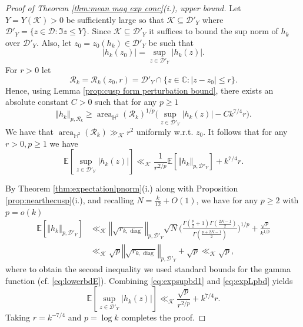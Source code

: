 \documentclass[12pt, a4paper]{amsart}
\newcommand{\tmop}[1]{\ensuremath{\operatorname{#1}}}
\theoremstyle{definition}
\newcommand {\1} {\mathbf{1}}
\newcommand {\Dc} {\mathcal{D}}
\newcommand {\Kc} {\mathcal{K}}
\numberwithin{equation}{section}
\begin{document}
\begin{proof}[Proof of Theorem \ref{thm:mean mag exp conc}(i.), upper bound]
Let $Y=Y(\Kc)>0$ be sufficiently large so that $\Kc \subseteq \Dc'_Y$ where $\Dc'_Y=\{ z \in \Dc : \Im z\le Y\}$. Since $\Kc \subseteq \Dc'_Y$ it suffices to bound the sup norm of $h_k$ over $\Dc'_Y$. Also, let $z_0=z_0(h_k)\in \Dc'_Y$ be such that
\[
|h_k(z_0)|=\sup_{z\in  \Dc'_Y} |h_k(z)|.
\]
For $r>0$ let
\[
\mathcal R_k=\mathcal R_k(z_0,r)=\Dc'_Y \cap \{ z \in \mathbb C :
|z-z_0|\le r\}.
\]
Hence, using Lemma \ref{prop:cusp form perturbation bound}, there exists an absolute constant $C>0$ such that for any $p \ge 1$ 
\[
\left\Vert h_k \right\Vert_{p,\mathcal R_k} \ge \tmop{area}_{\mathbb H^2}
(\mathcal R_k)^{1/p}\bigg( \sup_{z \in \Dc'_Y} |h_k(z)|-C k^{7/4}r\bigg).
\]
We have that $\tmop{area}_{\mathbb H^2}(\mathcal R_k) \gg_{\Kc} r^2$ uniformly w.r.t. $z_0$.
It follows that for any $r > 0, p \ge 1$ we have
\begin{equation} \label{eq:expsupbd1}
\mathbb E\left[\sup_{z\in  \Dc'_Y} |h_k(z)|\right] \ll_{\Kc} \frac{1}{r^{2/p}} \mathbb E \left[\left\Vert
h_k \right\Vert_{p,\Dc'_Y}\right]+k^{7/4}r.
\end{equation}


By Theorem \ref{thm:expectationlpnorm}(i.) along with Proposition \ref{prop:nearthecusp}(i.), and recalling $N=\frac{k}{12}+O(1)$, we have for any $p \ge 2$ with $p=o(k)$
\begin{equation} \label{eq:expLpbd}
\begin{split}
  \mathbb{E}\left[\left\Vert h_{k}\right\Vert _{p,\Dc'_Y}\right]& \ll_{\Kc} \left\Vert \sqrt{r_{k,\tmop{diag}}} \right\Vert_{p,\Dc'_Y} \sqrt{N} \bigg(\frac{\Gamma\left(\frac{p}{2}+1\right)\Gamma\left(\frac{2N-1}{2}\right)}{\Gamma\left(\frac{p+2N-1}{2}\right)} \bigg)^{1/p}+\frac{\sqrt{p}}{k^{1/p}} \\
   & \ll_{\Kc} \sqrt{p} \left\Vert \sqrt{r_{k,\tmop{diag}}} \right\Vert_{p,\Dc'_Y}  +\sqrt{p}\ll_{\Kc} \sqrt{p},
  \end{split}
\end{equation}
where to obtain the second inequality we used standard bounds for the gamma function (cf. \eqref{eq:lowerbdE}).
Combining \eqref{eq:expsupbd1} and \eqref{eq:expLpbd} yields
\[
\mathbb E\left[\sup_{z\in  \Dc'_Y} |h_k(z)|\right]  \ll_{\Kc} \frac{\sqrt{p}}{r^{2/p}}+k^{7/4}r.
\]
Taking $r=k^{-7/4}$ and $p=\log k$ completes the proof.%
\end{proof}
\end{document}
